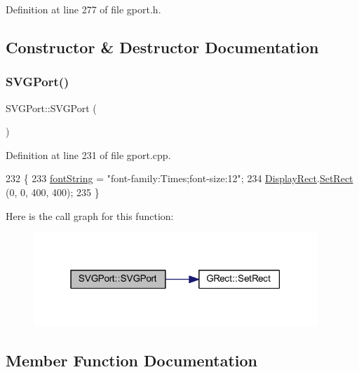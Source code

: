 Definition at line 277 of file gport.\+h.



\subsection{Constructor \& Destructor Documentation}
\mbox{\label{class_s_v_g_port_ae5600d35d7ba50be4395b575a8d61c79}} 
\subsubsection{\texorpdfstring{S\+V\+G\+Port()}{SVGPort()}}
{\footnotesize\ttfamily S\+V\+G\+Port\+::\+S\+V\+G\+Port (\begin{DoxyParamCaption}{ }\end{DoxyParamCaption})}



Definition at line 231 of file gport.\+cpp.


\begin{DoxyCode}
232 \{ 
233     \mbox{\hyperlink{class_s_v_g_port_a84d591ffe687b48a18ef8dbfebe9bce4}{fontString}} = \textcolor{stringliteral}{"font-family:Times;font-size:12"}; 
234     \mbox{\hyperlink{class_g_base_port_ac0e1180ebadeed5d3c7d0291db1bdf29}{DisplayRect}}.\mbox{\hyperlink{class_g_rect_a1fd6fd632b6d3c068382766a0c18340f}{SetRect}} (0, 0, 400, 400);
235 \}
\end{DoxyCode}
Here is the call graph for this function\+:\nopagebreak
\begin{figure}[H]
\begin{center}
\leavevmode
\includegraphics[width=303pt]{class_s_v_g_port_ae5600d35d7ba50be4395b575a8d61c79_cgraph}
\end{center}
\end{figure}


\subsection{Member Function Documentation}
\mbox{\label{class_s_v_g_port_a75ba37175c0a1fb943e1fd34c1e23f01}} 
